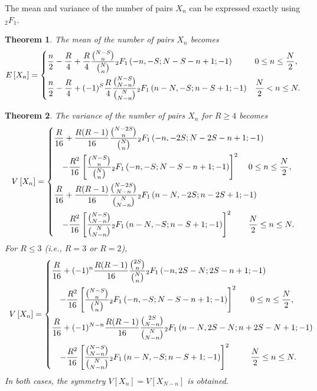 \documentclass[pre, amsmath, floatfix]{revtex4-2}
\theoremstyle{plain}
\newtheorem{theorem}{Theorem}[section]
\theoremstyle{definition}
\theoremstyle{remark}
\newcommand{\E}[1]{E\left[#1\right]} %
\newcommand{\Var}[1]{V\left[#1\right]} %
\newcommand{\GaussFsymbol}{{}_2F_1} %
\newcommand{\GaussF}[4]{\GaussFsymbol\left(#1, #2; #3; #4\right)} %
\begin{document}
The mean and variance of the number of pairs $X_n$ can be expressed exactly using $\GaussFsymbol$.

\begin{theorem}
The mean of the number of pairs $X_n$ becomes
\[
\E{X_n}=
\begin{dcases}
\frac{n}{2}-\frac{R}{4}+\frac{R}{4}\frac{\binom{N-S}{n}}{\binom{N}{n}}\GaussF{-n}{-S}{N-S-n+1}{-1} & 0\le n\le\frac{N}{2},\\
\frac{n}{2}-\frac{R}{4}+(-1)^S\frac{R}{4}\frac{\binom{N-S}{N-n}}{\binom{N}{N-n}}\GaussF{n-N}{-S}{n-S+1}{-1} & \frac{N}{2}<n\le N.
\end{dcases}
\]
\label{thm1}
\end{theorem}

\begin{theorem}
The variance of the number of pairs $X_n$ for $R\ge4$ becomes
\[
\Var{X_n}=
\begin{dcases}
\frac{R}{16}+\frac{R(R-1)}{16}\frac{\binom{N-2S}{n}}{\binom{N}{n}}\GaussF{-n}{-2S}{N-2S-n+1}{-1}\\
\quad-\frac{R^2}{16}\left[\frac{\binom{N-S}{n}}{\binom{N}{n}}\GaussF{-n}{-S}{N-S-n+1}{-1}\right]^2 & \hspace{-1cm} 0\le n\le\frac{N}{2},\\
\frac{R}{16}+\frac{R(R-1)}{16}\frac{\binom{N-2S}{N-n}}{\binom{N}{N-n}}\GaussF{n-N}{-2S}{n-2S+1}{-1}\\
\quad-\frac{R^2}{16}\left[\frac{\binom{N-S}{N-n}}{\binom{N}{N-n}}\GaussF{n-N}{-S}{n-S+1}{-1}\right]^2 & \hspace{-1cm} \frac{N}{2}\le n\le N.
\end{dcases}
\]
For $R\le 3$ \textup{(}i.e., $R=3$ or $R=2$\textup{)},
\[
\Var{X_n}=
\begin{dcases}
\frac{R}{16}+(-1)^n\frac{R(R-1)}{16}\frac{\binom{2S}{n}}{\binom{N}{n}}\GaussF{-n}{2S-N}{2S-n+1}{-1}\\
\quad-\frac{R^2}{16}\left[\frac{\binom{N-S}{n}}{\binom{N}{n}}\GaussF{-n}{-S}{N-S-n+1}{-1}\right]^2 & \hspace{-3cm} 0\le n\le\frac{N}{2},\\
\frac{R}{16}+(-1)^{N-n}\frac{R(R-1)}{16}\frac{\binom{2S}{N-n}}{\binom{N}{N-n}}\GaussF{n-N}{2S-N}{n+2S-N+1}{-1}\\
\quad-\frac{R^2}{16}\left[\frac{\binom{N-S}{N-n}}{\binom{N}{N-n}}\GaussF{n-N}{-S}{n-S+1}{-1}\right]^2 & \hspace{-3cm} \frac{N}{2}\le n\le N.
\end{dcases}
\]
In both cases, the symmetry $\Var{X_n}=\Var{X_{N-n}}$ is obtained.
\label{thm2}
\end{theorem}
\end{document}
